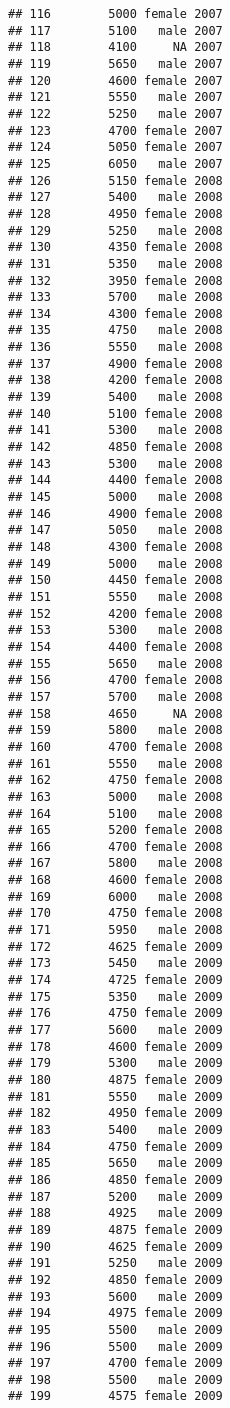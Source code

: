 \documentclass[
]{article}
\begin{document}
\begin{verbatim}
## 116        5000 female 2007
## 117        5100   male 2007
## 118        4100     NA 2007
## 119        5650   male 2007
## 120        4600 female 2007
## 121        5550   male 2007
## 122        5250   male 2007
## 123        4700 female 2007
## 124        5050 female 2007
## 125        6050   male 2007
## 126        5150 female 2008
## 127        5400   male 2008
## 128        4950 female 2008
## 129        5250   male 2008
## 130        4350 female 2008
## 131        5350   male 2008
## 132        3950 female 2008
## 133        5700   male 2008
## 134        4300 female 2008
## 135        4750   male 2008
## 136        5550   male 2008
## 137        4900 female 2008
## 138        4200 female 2008
## 139        5400   male 2008
## 140        5100 female 2008
## 141        5300   male 2008
## 142        4850 female 2008
## 143        5300   male 2008
## 144        4400 female 2008
## 145        5000   male 2008
## 146        4900 female 2008
## 147        5050   male 2008
## 148        4300 female 2008
## 149        5000   male 2008
## 150        4450 female 2008
## 151        5550   male 2008
## 152        4200 female 2008
## 153        5300   male 2008
## 154        4400 female 2008
## 155        5650   male 2008
## 156        4700 female 2008
## 157        5700   male 2008
## 158        4650     NA 2008
## 159        5800   male 2008
## 160        4700 female 2008
## 161        5550   male 2008
## 162        4750 female 2008
## 163        5000   male 2008
## 164        5100   male 2008
## 165        5200 female 2008
## 166        4700 female 2008
## 167        5800   male 2008
## 168        4600 female 2008
## 169        6000   male 2008
## 170        4750 female 2008
## 171        5950   male 2008
## 172        4625 female 2009
## 173        5450   male 2009
## 174        4725 female 2009
## 175        5350   male 2009
## 176        4750 female 2009
## 177        5600   male 2009
## 178        4600 female 2009
## 179        5300   male 2009
## 180        4875 female 2009
## 181        5550   male 2009
## 182        4950 female 2009
## 183        5400   male 2009
## 184        4750 female 2009
## 185        5650   male 2009
## 186        4850 female 2009
## 187        5200   male 2009
## 188        4925   male 2009
## 189        4875 female 2009
## 190        4625 female 2009
## 191        5250   male 2009
## 192        4850 female 2009
## 193        5600   male 2009
## 194        4975 female 2009
## 195        5500   male 2009
## 196        5500   male 2009
## 197        4700 female 2009
## 198        5500   male 2009
## 199        4575 female 2009

\end{verbatim}
\end{document}
